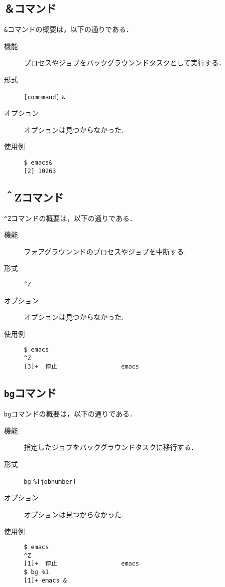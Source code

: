 \documentclass[a4j,11pt]{jarticle}
\begin{document}
\subsection{＆コマンド}
\verb|&|コマンドの概要は，以下の通りである．
\begin{description}
  \item[機能]
    プロセスやジョブをバックグラウンンドタスクとして実行する．
  \item[形式]
    \verb|[commmand]| \verb|&|
  \item[オプション]
    オプションは見つからなかった.
  \item[使用例]
    \begin{verbatim}
$ emacs&
[2] 10263
    \end{verbatim}
\end{description}

\subsection{＾Zコマンド}
\verb|^Z|コマンドの概要は，以下の通りである．
\begin{description}
  \item[機能]
    フォアグラウンンドのプロセスやジョブを中断する.
  \item[形式]
    \verb|^Z|
  \item[オプション]
オプションは見つからなかった.
  \item[使用例]
    \begin{verbatim}
$ emacs
^Z
[3]+  停止                  emacs
    \end{verbatim}
\end{description}

\subsection{\texttt{bg}コマンド}
\verb|bg|コマンドの概要は，以下の通りである．
\begin{description}
  \item[機能]
    指定したジョブをバックグラウンドタスクに移行する．
  \item[形式]
    \verb|bg| \verb|%|\verb|[jobnumber]|
  \item[オプション]
オプションは見つからなかった.
  \item[使用例]
    \begin{verbatim}
$ emacs
^Z
[1]+  停止                  emacs
$ bg %1
[1]+ emacs &
    \end{verbatim}
\end{description}
\end{document}
